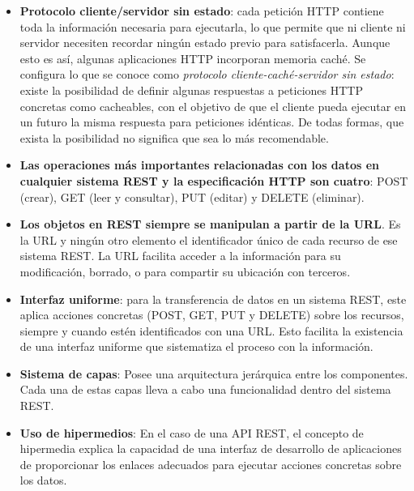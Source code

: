 \begin{itemize}
    \item \textbf{Protocolo cliente/servidor sin estado}: cada petición HTTP contiene toda la información necesaria para ejecutarla, lo que permite que ni cliente ni servidor necesiten recordar ningún estado previo para satisfacerla. Aunque esto es así, algunas aplicaciones HTTP incorporan memoria caché. Se configura lo que se conoce como \textit{protocolo cliente-caché-servidor sin estado}: existe la posibilidad de definir algunas respuestas a peticiones HTTP concretas como cacheables, con el objetivo de que el cliente pueda ejecutar en un futuro la misma respuesta para peticiones idénticas. De todas formas, que exista la posibilidad no significa que sea lo más recomendable.
    
    \item \textbf{Las operaciones más importantes relacionadas con los datos en cualquier sistema REST y la especificación HTTP son cuatro}: POST (crear), GET (leer y consultar), PUT (editar) y DELETE (eliminar).
    
    \item  \textbf{Los objetos en REST siempre se manipulan a partir de la URL}. Es la URL y ningún otro elemento el identificador único de cada recurso de ese sistema REST. La URL facilita acceder a la información para su modificación, borrado, o para compartir su ubicación con terceros. 
    
    \item  \textbf{Interfaz uniforme}: para la transferencia de datos en un sistema REST, este aplica acciones concretas (POST, GET, PUT y DELETE) sobre los recursos, siempre y cuando estén identificados con una URL. Esto facilita la existencia de una interfaz uniforme que sistematiza el proceso con la información.
    
    \item  \textbf{Sistema de capas}: Posee una arquitectura jerárquica entre los componentes. Cada una de estas capas lleva a cabo una funcionalidad dentro del sistema REST.

    \item  \textbf{Uso de hipermedios}: 
    En el caso de una API REST, el concepto de hipermedia explica la capacidad de una interfaz de desarrollo de aplicaciones de proporcionar los enlaces adecuados para ejecutar acciones concretas sobre los datos.
\end{itemize}


